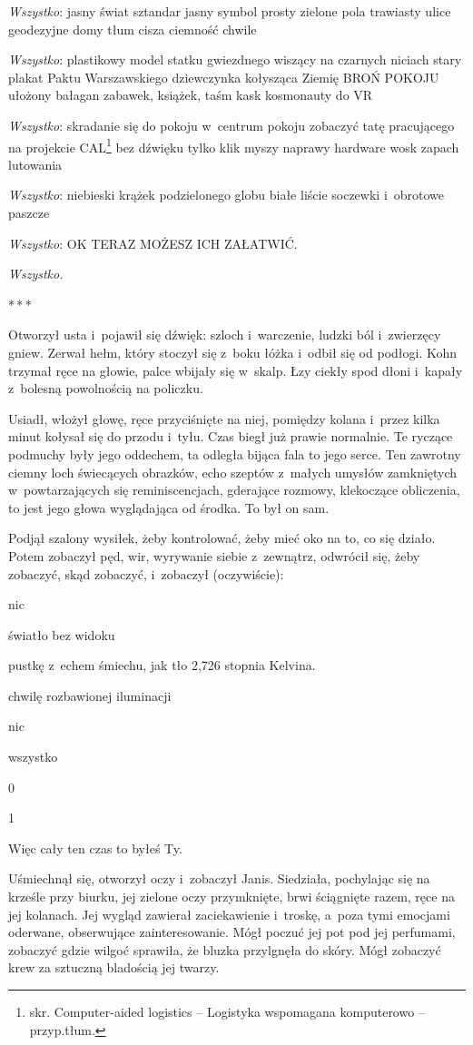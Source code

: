\documentclass[oneside,polish,11pt,sfheadings]{mwbk}
\newcommand{\threeast}{\bigskip\par\centerline{*\,*\,*}\medskip\par}%
\begin{document}
\emph{Wszystko}: jasny świat sztandar jasny symbol prosty zielone pola
trawiasty ulice geodezyjne domy tłum cisza ciemność chwile

\emph{Wszystko}: plastikowy model statku gwiezdnego wiszący na czarnych
niciach stary plakat Paktu Warszawskiego dziewczynka kołysząca Ziemię
BROŃ POKOJU ułożony bałagan zabawek, książek, taśm kask kosmonauty do VR

\emph{Wszystko}: skradanie się do pokoju w~centrum pokoju zobaczyć tatę
pracującego na projekcie CAL\footnote{skr. Computer-aided logistics --
Logistyka wspomagana komputerowo -- przyp.tłum.} bez dźwięku tylko klik
myszy naprawy hardware wosk zapach lutowania

\emph{Wszystko}: niebieski krążek podzielonego globu białe liście
soczewki i~obrotowe paszcze

\emph{Wszystko}: OK TERAZ MOŻESZ ICH ZAŁATWIĆ.

\emph{Wszystko.}
  \threeast 

Otworzył usta i~pojawił się dźwięk: szloch i~warczenie, ludzki ból i~zwierzęcy gniew. Zerwał hełm, który stoczył się z~boku łóżka i~odbił się
od podłogi. Kohn trzymał ręce na głowie, palce wbijały się w~skalp. Łzy
ciekły spod dłoni i~kapały z~bolesną powolnością na policzku.

Usiadł, włożył głowę, ręce przyciśnięte na niej, pomiędzy kolana i~przez
kilka minut kołysał się do przodu i~tyłu. Czas biegł już prawie
normalnie. Te ryczące podmuchy były jego oddechem, ta odległa bijąca
fala to jego serce. Ten zawrotny ciemny loch świecących obrazków, echo
szeptów z~małych umysłów zamkniętych w~powtarzających się
reminiscencjach, gderające rozmowy, klekoczące obliczenia, to jest jego
głowa wyglądająca od środka. To był on sam.

Podjął szalony wysiłek, żeby kontrolować, żeby mieć oko na to, co się
działo. Potem zobaczył pęd, wir, wyrywanie siebie z~zewnątrz, odwrócił
się, żeby zobaczyć, skąd zobaczyć, i~zobaczył (oczywiście):

nic

światło bez widoku

pustkę z~echem śmiechu, jak tło 2,726 stopnia Kelvina.

chwilę rozbawionej iluminacji

nic

wszystko

0

1

Więc cały ten czas to byłeś Ty.

Uśmiechnął się, otworzył oczy i~zobaczył Janis. Siedziała, pochylając
się na krześle przy biurku, jej zielone oczy przymknięte, brwi
ściągnięte razem, ręce na jej kolanach. Jej wygląd zawierał
zaciekawienie i~troskę, a~poza tymi emocjami oderwane, obserwujące
zainteresowanie. Mógł poczuć jej pot pod jej perfumami, zobaczyć gdzie
wilgoć sprawiła, że bluzka przylgnęła do skóry. Mógł zobaczyć krew za
sztuczną bladością jej twarzy.
\end{document}

